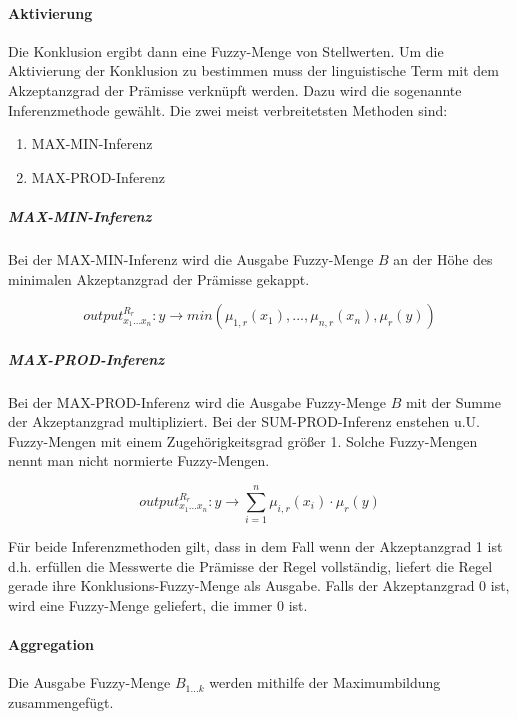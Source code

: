 \documentclass[12pt,a4paper,bibliography=totocnumbered,listof=totocnumbered]{scrartcl}
\theoremstyle{Umgebung}
\begin{document}
\paragraph{Aktivierung}

Die Konklusion ergibt dann eine Fuzzy-Menge von Stellwerten. Um die Aktivierung der Konklusion zu bestimmen muss der linguistische Term mit dem Akzeptanzgrad der Prämisse verknüpft werden. Dazu wird die sogenannte Inferenzmethode gewählt. Die zwei meist verbreitetsten Methoden sind: 

\begin{enumerate} 
	\item MAX-MIN-Inferenz
	\item MAX-PROD-Inferenz
\end{enumerate}

\subparagraph{MAX-MIN-Inferenz}

Bei der MAX-MIN-Inferenz wird die Ausgabe Fuzzy-Menge $B$ an der Höhe des minimalen Akzeptanzgrad der Prämisse gekappt. 

\begin{equation}
	output^{R_r}_{x_1...x_n}:  y \rightarrow min(\mu_{1,r}(x_1), ..., \mu_{n,r}(x_n), \mu_r(y))
\end{equation}

\subparagraph{MAX-PROD-Inferenz}

Bei der MAX-PROD-Inferenz wird die Ausgabe Fuzzy-Menge $B$ mit der Summe der Akzeptanzgrad multipliziert. Bei der SUM-PROD-Inferenz enstehen u.U. Fuzzy-Mengen mit einem Zugehörigkeitsgrad größer 1. Solche Fuzzy-Mengen nennt man nicht normierte Fuzzy-Mengen.

\begin{equation}
output^{R_r}_{x_1...x_n}:  y \rightarrow \sum_{i = 1}^{n} \mu_{i,r}(x_i) \cdot \mu_r(y)
\end{equation}

Für beide Inferenzmethoden gilt, dass in dem Fall wenn der Akzeptanzgrad 1 ist d.h. erfüllen die Messwerte die Prämisse der Regel vollständig, liefert die Regel gerade ihre Konklusions-Fuzzy-Menge als Ausgabe. Falls der Akzeptanzgrad 0 ist, wird eine Fuzzy-Menge geliefert, die immer 0 ist.

\paragraph{Aggregation}

Die Ausgabe Fuzzy-Menge $B_{1...k}$ werden mithilfe der Maximumbildung zusammengefügt.












\end{document}
